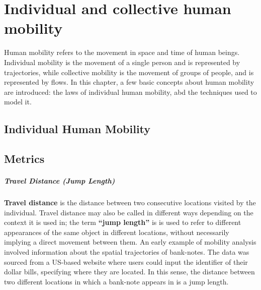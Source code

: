 \chapter{Individual and collective human mobility}

Human mobility refers to the movement in space and time of human beings. Individual mobility is the movement of a single person and is represented by trajectories, while collective mobility is the movement of groups of people, and is represented by flows.  In this chapter, a few basic concepts about human mobility are introduced: the laws of individual human mobility, abd the techniques used to model it.

\section{Individual Human Mobility}

\section{Metrics}

\paragraph{Travel Distance (Jump Length)}

\textbf{Travel distance} is the distance between two consecutive locations visited by the individual. Travel distance may also be called in different ways depending on the context it is used in; the term \textbf{``jump length''} is is used to refer to different appearances of the same object in different locations, without necessarily implying a direct movement between them. An early example of mobility analysis involved information about the spatial trajectories of bank-notes. The data was sourced from a US-based website where users could input the identifier of their dollar bills, specifying where they are located. In this sense, the distance between two different locations in which a bank-note appears in is a jump length.

